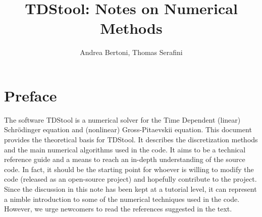 \documentclass[a4paper,11pt]{article}
\title{TDStool: Notes on Numerical Methods}
\author{Andrea Bertoni, Thomas Serafini}
\begin{document}
\begin{titlepage}



\vspace{40mm}

\vspace{20mm}

\vspace{60mm}

\vspace{10mm}

\normalsize

\newpage
\pagestyle{empty}
\mbox{}
\end{titlepage}

\section*{Preface}
The software TDStool is a numerical solver for the Time Dependent (linear)
Schr\"odinger equation and (nonlinear) Gross-Pitaevskii equation.
This document provides the theoretical basis for TDStool.
It describes the discretization methods and the main numerical
algorithms used in the code. It aims to be a technical reference guide
and a means to reach an in-depth understanding of the source code.
In fact, it should be the starting point for whoever is willing to
modify the code (released as an open-source project) and hopefully contribute
to the project.
Since the discussion in this note has been kept at a tutorial level, 
it can represent a nimble introduction to some of the numerical techniques
used in the code. However, we urge newcomers to read the references
suggested in the text.
\end{document}
